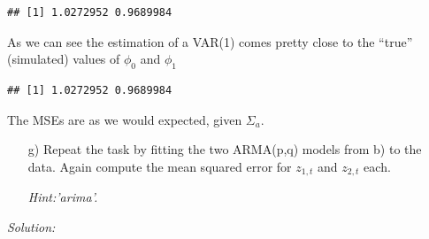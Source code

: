 \documentclass[12pt,a4paper]{article}
\newenvironment{Shaded}{\begin{snugshade}}{\end{snugshade}}
\newcommand{\CommentTok}[1]{\textcolor[rgb]{0.56,0.35,0.01}{\textit{#1}}}
\newcommand{\DataTypeTok}[1]{\textcolor[rgb]{0.13,0.29,0.53}{#1}}
\newcommand{\DecValTok}[1]{\textcolor[rgb]{0.00,0.00,0.81}{#1}}
\newcommand{\KeywordTok}[1]{\textcolor[rgb]{0.13,0.29,0.53}{\textbf{#1}}}
\newcommand{\NormalTok}[1]{#1}
\newcommand{\OperatorTok}[1]{\textcolor[rgb]{0.81,0.36,0.00}{\textbf{#1}}}
\newcommand{\OtherTok}[1]{\textcolor[rgb]{0.56,0.35,0.01}{#1}}
\newcommand{\StringTok}[1]{\textcolor[rgb]{0.31,0.60,0.02}{#1}}
\begin{document}
\begin{verbatim}
## [1] 1.0272952 0.9689984
\end{verbatim}

As we can see the estimation of a VAR(1) comes pretty close to the
\enquote{true} (simulated) values of \(\phi_0\) and \(\phi_1\)

\begin{Shaded}
\end{Shaded}

\begin{verbatim}
## [1] 1.0272952 0.9689984
\end{verbatim}

The MSEs are as we would expected, given \(\Sigma_a\).

\begin{itemize}
    \item[g)] Repeat the task by fitting the two ARMA(p,q) models from b) to the data. Again compute the mean squared error for $z_{1,t}$ and $z_{2,t}$ each.
    \item[]  \textit{Hint:’arima’.}
\end{itemize}

\emph{Solution:}

\begin{Shaded}
\end{Shaded}
\end{document}
